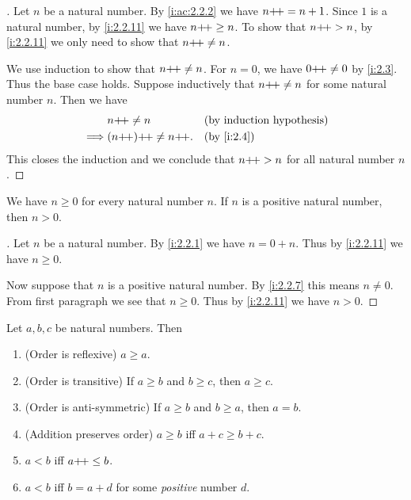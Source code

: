 \begin{proof}[]
  Let \(n\) be a natural number.
  By \cref{i:ac:2.2.2} we have \(n{+}\!{+} = n + 1\).
  Since \(1\) is a natural number, by \cref{i:2.2.11} we have \(n{+}\!{+} \geq n\).
  To show that \(n{+}\!{+} > n\), by \cref{i:2.2.11} we only need to show that \(n{+}\!{+} \neq n\).

  We use induction to show that \(n{+}\!{+} \neq n\).
  For \(n = 0\), we have \(0{+}\!{+} \neq 0\) by \cref{i:2.3}.
  Thus the base case holds.
  Suppose inductively that \(n{+}\!{+} \neq n\) for some natural number \(n\).
  Then we have
  \begin{align*}
             & n\pp \neq n          &  & \byIH      \\
    \implies & (n\pp)\pp \neq n\pp. &  & \by{i:2.4}
  \end{align*}
  This closes the induction and we conclude that \(n{+}\!{+} > n\) for all natural number \(n\).
\end{proof}

\begin{ac}\label{i:ac:2.2.4}
  We have \(n \geq 0\) for every natural number \(n\).
  If \(n\) is a positive natural number, then \(n > 0\).
\end{ac}

\begin{proof}[]
  Let \(n\) be a natural number.
  By \cref{i:2.2.1} we have \(n = 0 + n\).
  Thus by \cref{i:2.2.11} we have \(n \geq 0\).

  Now suppose that \(n\) is a positive natural number.
  By \cref{i:2.2.7} this means \(n \neq 0\).
  From first paragraph we see that \(n \geq 0\).
  Thus by \cref{i:2.2.11} we have \(n > 0\).
\end{proof}

\begin{prop}\label{i:2.2.12}
  Let \(a, b, c\) be natural numbers.
  Then
  \begin{enumerate}
    \item (Order is reflexive) \(a \geq a\).
    \item (Order is transitive) If \(a \geq b\) and \(b \geq c\), then \(a \geq c\).
    \item (Order is anti-symmetric) If \(a \geq b\) and \(b \geq a\), then \(a = b\).
    \item (Addition preserves order) \(a \geq b\) iff \(a + c \geq b + c\).
    \item \(a < b\) iff \(a{+}\!{+} \leq b\).
    \item \(a < b\) iff \(b = a + d\) for some \emph{positive} number \(d\).
  \end{enumerate}
\end{prop}

